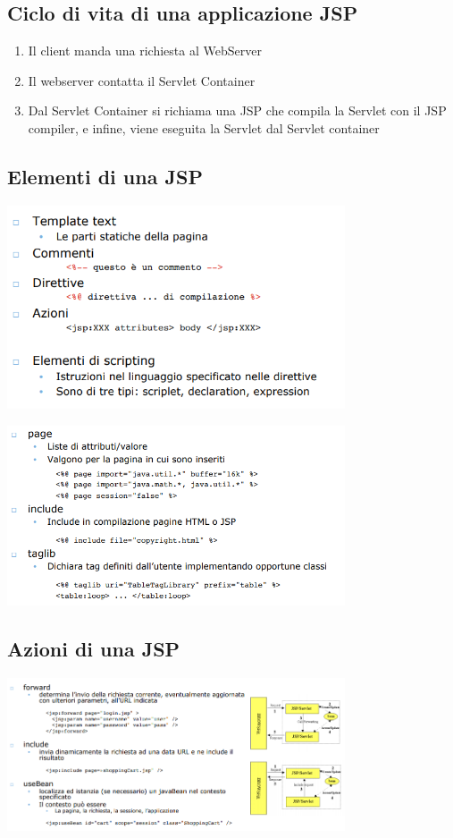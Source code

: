 \documentclass[12pt, a4paper, openany, twoside]{book}
\begin{document}
\subsection{Ciclo di vita di una applicazione JSP}
\begin{enumerate}
	\item Il client manda una richiesta al WebServer
	\item Il webserver contatta il Servlet Container
	\item Dal Servlet Container si richiama una JSP che compila la Servlet
	con il JSP compiler, e infine, viene eseguita la Servlet dal Servlet
	container
\end{enumerate}
\subsection{Elementi di una JSP}
\begin{center}
\includegraphics[width=0.75\textwidth]{9}
\end{center}
\begin{center}
\includegraphics[width=0.75\textwidth]{10}
\end{center}
\subsection{Azioni di una JSP}
\begin{center}
\includegraphics[width=0.75\textwidth]{11}
\end{center}
\end{document}
